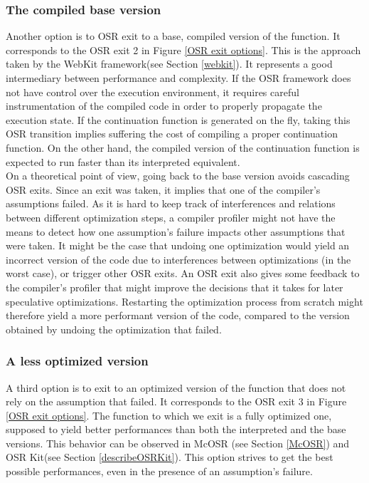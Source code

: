 \subsubsection{The compiled base version}
Another option is to OSR exit to a base, compiled version of the function.
It corresponds to the OSR exit 2 in Figure \ref{OSR exit options}.
This is the approach taken by the WebKit framework\cite{WebKitURL}(see Section \ref{webkit}).
It represents a good intermediary between performance and complexity.
If the OSR framework does not have control over the execution environment, it requires careful instrumentation of the compiled code in order to properly propagate the execution state.
If the continuation function is generated on the fly, taking this OSR transition implies suffering the cost of compiling a proper continuation function.
On the other hand, the compiled version of the continuation function is expected to run faster than its interpreted equivalent.\\

On a theoretical point of view, going back to the base version avoids cascading OSR exits.
Since an exit was taken, it implies that one of the compiler's assumptions failed.
As it is hard to keep track of interferences and relations between different optimization steps, a compiler profiler might not have the means to detect how one assumption's failure impacts other assumptions that were taken.
It might be the case that undoing one optimization would yield an incorrect version of the code due to interferences between optimizations (in the worst case), or trigger other OSR exits.
An OSR exit also gives some feedback to the compiler's profiler that might improve the decisions that it takes for later speculative optimizations.
Restarting the optimization process from scratch might therefore yield a more performant version of the code, compared to the version obtained by undoing the optimization that failed.\\

\subsubsection{A less optimized version}
A third option is to exit to an optimized version of the function that does not rely on the assumption that failed.
It corresponds to the OSR exit 3 in Figure \ref{OSR exit options}.
The function to which we exit is a fully optimized one, supposed to yield better performances than both the interpreted and the base versions.
This behavior can be observed in McOSR\cite{lameed2013modular} (see Section \ref{McOSR}) and OSR Kit\cite{OSRKit}(see Section \ref{describeOSRKit}).
This option strives to get the best possible performances, even in the presence of an assumption's failure.\\

